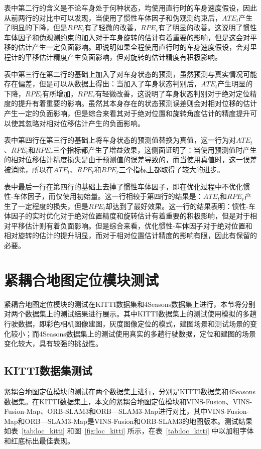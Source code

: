 表中第二行的含义是不论车身处于何种状态，均使用直行时的车身速度假设，因此从前两行的对比中可以发现，当使用了惯性车体因子和伪观测约束后，$ATE_t$产生了明显的下降，但是$RPE_t$有了轻微的改善，$RPE_r$有了明显的改善。这说明了惯性车体因子和伪观测约束的加入对于车身旋转的估计有着重要的影响，但是这会对平移的估计产生一定负面影响。即说明如果全程使用直行时的车身速度假设，会对里程计的平移估计精度产生负面影响，但对旋转的估计精度有积极影响。

表中第三行在第二行的基础上加入了对车身状态的预测，虽然预测与真实情况可能存在偏差，但是可以从数据上得出：当加入了车身状态判别后，$ATE_t$产生明显的下降，$RPE_t$有所增加，$RPE_r$有轻微改善，这说明了车身状态判别对于绝对定位精度的提升有着重要的影响。虽然其本身存在的状态预测误差则会对相对位移的估计产生一定的负面影响，但是综合来看其对于绝对位置和旋转角度估计的精度提升可以使其忽略对相对位移估计产生的负面影响。

表中第四行在第三行的基础上将车身状态的预测值替换为真值，这一行为对$ATE_t$、$RPE_t$和$RPE_r$三个指标都产生了增益效果，这侧面证明了：当使用预测值时产生的相对位移估计精度损失是由于预测值的误差导致的，而当使用真值时，这一误差被消除，所以在$ATE_t$、$RPE_t$和$RPE_r$三个指标上都取得了较大的进步。

表中最后一行在第四行的基础上去掉了惯性车体因子，即在优化过程中不优化惯性-车体因子，而仅使用初始量。这一行相较于第四行的结果是：$ATE_t$和$RPE_r$产生了一定程度的损失，但是$RPE_t$却达到了最好效果。这一行的结果表明：惯性-车体因子的实时优化对于绝对位置精度和旋转估计有着重要的积极影响，但是对于相对平移估计则有着负面影响。但是综合来看，优化惯性-车体因子对于绝对位置和相对旋转的估计的提升明显，而对于相对位置估计精度的影响有限，因此有保留的必要。

\section{紧耦合地图定位模块测试}
紧耦合地图定位模块的测试在KITTI数据集和4Seasons数据集上进行，本节将分别对两个数据集上的测试结果进行展示。其中KITTI数据集上的测试使用模拟的多趟行驶数据，即彩色相机图像建图，灰度图像定位的模式，建图场景和测试场景的变化较小；而4Seasons数据集上的测试使用真实的多趟行驶数据，定位和建图的场景变化较大，具有较强的挑战性。

\subsection{KITTI数据集测试}
紧耦合地图定位模块的测试在两个数据集上进行，分别是KITTI数据集和4Seasons数据集。在KITTI数据集上，本文的紧耦合地图定位模块和VINS-Fusion、VINS-Fusion-Map、ORB-SLAM3和ORB—SLAM3-Map进行对比，其中VINS-Fusion-Map和ORB—SLAM3-Map是VINS-Fusion和ORB-SLAM3的地图版本。测试结果如表~\ref{tab:loc_kitti} 和图~\ref{fig:loc_kitti} 所示，在表~\ref{tab:loc_kitti} 中以加粗字体和红底标出最佳表现。

